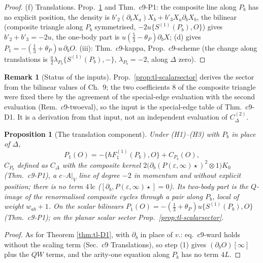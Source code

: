 \documentclass[11pt]{article}
\numberwithin{equation}{section}
\theoremstyle{plain}
\newtheorem{proposition}[theorem]{Proposition}
\theoremstyle{definition}
\newtheorem{remark}[theorem]{Remark}
\begin{document}
\begin{proof}
(f) Translations. Prop.~\ref{prop:tl-P1} and Thm.~c9-P1: the composite line along $P_b$ has no explicit position, the density is $b'_2(\partial_bX_a)X_b+b'_3X_a\partial_bX_b$, the bilinear (composite triangle along $P_b$ symmetrised, $-2u\{S^{(1)}(P_b),O\}$) gives $b'_2+b'_3=-2u$, the one-body part is $u(\tfrac53-\theta_P)\partial_bX$; (d) gives $P_1=-(\tfrac13+\theta_P)u\,\partial_bO$. (iii): Thm.~c9-kappa, Prop.~c9-scheme (the change along translations is $\tfrac a2\lambda_{P_b}\{S^{(1)}(P_b),-\}$, $\lambda_{P_b}=-2$, along $\Delta$ zero).
\end{proof}

\begin{remark}[Status of the inputs]
\label{rem:tl-inputs}
Prop.~\ref{prop:tl-scalarsector} derives the sector from the bilinear values of Ch.~9; the two coefficients $8$ of the composite triangle were fixed there by the agreement of the special-edge evaluation with the second evaluation (Rem.~c9-twoeval), so the input is the special-edge table of Thm.~c9-D1. It is a derivation from that input, not an independent evaluation of $C^{(2)}_\Delta$.
\end{remark}

\begin{proposition}[The translation component]
\label{prop:tl-P1}
Under (H1)--(H3) with $P_b$ in place of $\Delta$,
\[
P_1(O)=-\{\hbar F_1^{(1)}(P_b),O\}+C_{P_b}(O),
\]
$C_{P_b}$ defined as $C_\Delta$ with the composite kernel $2\big(\partial_b(P(\varepsilon,\infty)\star)^2\otimes1\big)K_0$ (Thm.~c9-P1), a $c$--$A|_V$ line of degree $-2$ in momentum and without explicit position; there is no term $4\,\mathrm{lc}$ ($[\partial_b,P(\varepsilon,\infty)\star]=0$). Its two-body part is the $Q$-image of the renormalised composite cycles through a pair along $P_b$, local of weight $w_{ab}+1$. On the scalar bilinears $P_1(O)=-(\tfrac13+\theta_P)u\{S^{(1)}(P_b),O\}$ (Thm.~c9-P1); on the planar scalar sector Prop.~\ref{prop:tl-scalarsector}.
\end{proposition}

\begin{proof}
As for Theorem \ref{thm:tl-D1}, with $\partial_b$ in place of $v.$: eq.~c9-ward holds without the scaling term (Sec.~c9 Translations), so step (1) gives $(\partial_bO)[\infty]$ plus the $QW$ terms, and the arity-one equation along $P_b$ has no term $4L$.
\end{proof}
\end{document}
